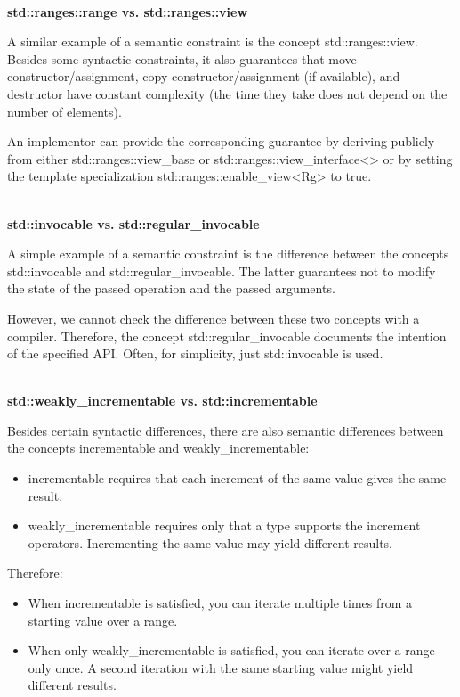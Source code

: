 \noindent
\hspace*{\fill} \\ %
\textbf{std::ranges::range vs. std::ranges::view}

A similar example of a semantic constraint is the concept std::ranges::view. Besides some syntactic constraints, it also guarantees that move constructor/assignment, copy constructor/assignment (if available), and destructor have constant complexity (the time they take does not depend on the number of elements).

An implementor can provide the corresponding guarantee by deriving publicly from either std::ranges::view\_base or std::ranges::view\_interface<> or by setting the template specialization std::ranges::enable\_view<Rg> to true.

\noindent
\hspace*{\fill} \\ %
\textbf{std::invocable vs. std::regular\_invocable}

A simple example of a semantic constraint is the difference between the concepts std::invocable and std::regular\_invocable. The latter guarantees not to modify the state of the passed operation and the passed arguments.

However, we cannot check the difference between these two concepts with a compiler. Therefore, the concept std::regular\_invocable documents the intention of the specified API. Often, for simplicity, just std::invocable is used.

\noindent
\hspace*{\fill} \\ %
\textbf{std::weakly\_incrementable vs. std::incrementable}

Besides certain syntactic differences, there are also semantic differences between the concepts incrementable and weakly\_incrementable:

\begin{itemize}
\item
incrementable requires that each increment of the same value gives the same result.

\item
weakly\_incrementable requires only that a type supports the increment operators. Incrementing the same value may yield different results.
\end{itemize}

Therefore:

\begin{itemize}
\item
When incrementable is satisfied, you can iterate multiple times from a starting value over a range.

\item
When only weakly\_incrementable is satisfied, you can iterate over a range only once. A second iteration with the same starting value might yield different results.
\end{itemize}

